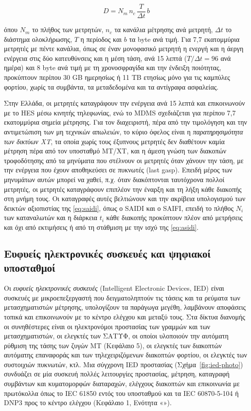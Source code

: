 \begin{equation}
D = N_m\,n_c\,\frac{T}{\Delta t}\,b
\label{eq:ami-data}
\end{equation}

όπου $N_m$ το πλήθος των μετρητών, $n_c$ τα κανάλια μέτρησης ανά μετρητή, $\Delta t$ το
διάστημα ολοκλήρωσης, $T$ η περίοδος και $b$ τα byte ανά τιμή. Για 7,7 εκατομμύρια μετρητές
με πέντε κανάλια, όπως σε έναν μονοφασικό μετρητή η ενεργή και η άεργη ενέργεια στις δύο
κατευθύνσεις και η μέση τάση, ανά 15 λεπτά ($T/\Delta t = 96$ ανά ημέρα) και 8 byte ανά τιμή
με τη χρονοσφραγίδα και την ένδειξη ποιότητας, προκύπτουν περίπου 30 GB ημερησίως ή 11 TB
ετησίως μόνο για τις καμπύλες φορτίου, χωρίς τα συμβάντα, τα μεταδεδομένα και τα αντίγραφα
ασφαλείας.

Στην Ελλάδα, οι μετρητές καταγράφουν την ενέργεια ανά 15 λεπτά και επικοινωνούν με το HES μέσω
κινητής τηλεφωνίας, ενώ το MDMS σχεδιάζεται για περίπου 7,7 εκατομμύρια σημεία μέτρησης. Για τον διαχειριστή, πέρα από την τιμολόγηση και την
αντιμετώπιση των μη τεχνικών απωλειών, το κύριο όφελος είναι η \emph{παρατηρησιμότητα των
δικτύων ΧΤ}, τα οποία χωρίς τους έξυπνους μετρητές
δεν διαθέτουν καμία μέτρηση πέρα από τον υποσταθμό ΜΤ/ΧΤ, και η άμεση γνώση των διακοπών
τροφοδότησης από τα μηνύματα που στέλνουν οι μετρητές όταν χάνουν την τάση, με την ενέργεια
που έχουν αποθηκεύσει σε πυκνωτές (last gasp). Επειδή μέρος των μηνυμάτων αυτών μπορεί να
χαθεί, π.χ. όταν διακόπτονται ταυτόχρονα πολλοί μετρητές, οι μετρητές καταγράφουν επιπλέον την
έναρξη και τη λήξη κάθε διακοπής στη μνήμη τους. Οι καταγραφές αυτές βελτιώνουν και την
ακρίβεια υπολογισμού των δεικτών αξιοπιστίας της \eqref{eq:saidi}, όπως ο SAIDI και ο SAIFI,
επειδή το πλήθος $N_i$ των καταναλωτών και η διάρκεια $t_i$ κάθε διακοπής προκύπτουν πλέον από
μετρήσεις και όχι από εκτιμήσεις ή από τη στάθμιση με την ισχύ της \eqref{eq:asidi}.

\subsection{Ευφυείς ηλεκτρονικές συσκευές και ψηφιακοί υποσταθμοί}
\label{sec:ied}

Οι \emph{ευφυείς ηλεκτρονικές συσκευές} (Intelligent Electronic Devices, IED) είναι συσκευές
με μικροεπεξεργαστή που δειγματοληπτούν τις τάσεις και τα ρεύματα των μετασχηματιστών
μέτρησης, υπολογίζουν τα παράγωγα μεγέθη, λαμβάνουν αποφάσεις τοπικά και επικοινωνούν με το
κέντρο ελέγχου και μεταξύ τους. Στα δίκτυα διανομής οι συνηθέστερες είναι οι ηλεκτρονόμοι
προστασίας των γραμμών και των μετασχηματιστών, οι ελεγκτές των ΣΑΤΥΦ, οι οποίοι υλοποιούν
την αυτόματη ρύθμιση της τάσης των ζυγών ΜΤ (Κεφάλαιο 5), οι
ελεγκτές των διακοπτών αυτόματης επαναφοράς και των τηλεχειριζόμενων διακοπτών φορτίου, οι
ελεγκτές των συστοιχιών πυκνωτών, κτλ. Μια σύγχρονη IED προστασίας
(Σχήμα~\ref{fig:ied-photo}) συνδυάζει σε μία συσκευή πολλές λειτουργίες προστασίας, μέτρηση,
καταγραφή συμβάντων και κυματομορφών διαταραχών, ελέγχους διακοπτών και επικοινωνία με
πρωτόκολλα όπως το IEC 61850 εντός του υποσταθμού και τα IEC 60870-5-104 ή DNP3 προς το
κέντρο ελέγχου (Κεφάλαιο 1, Ενότητα «»).

